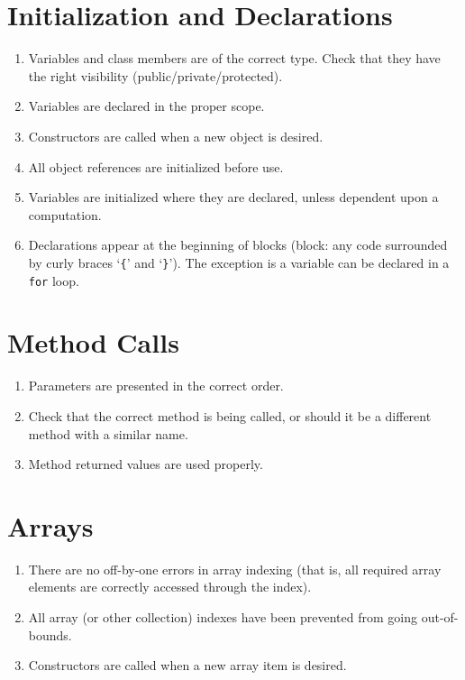 \documentclass{scrreprt}
\begin{document}
\begin{appendix}
\section*{Initialization and Declarations}\begin{enumerate}[resume]
\item Variables and class members are of the correct type. Check that they have the right visibility (public/private/protected).
\item Variables are declared in the proper scope.
\item Constructors are called when a new object is desired.
\item All object references are initialized before use.
\item Variables are initialized where they are declared, unless dependent upon a computation.
\item Declarations appear at the beginning of blocks (block: any code surrounded by curly braces `\texttt{\{}' and `\texttt{\}}'). The exception is a variable can be declared in a \texttt{for} loop.
\end{enumerate}

\section*{Method Calls}\begin{enumerate}[resume]
\item Parameters are presented in the correct order.
\item Check that the correct method is being called, or should it be a different method with a similar name.
\item Method returned values are used properly.
\end{enumerate}

\section*{Arrays}\begin{enumerate}[resume]
\item There are no off-by-one errors in array indexing (that is, all required array elements are correctly accessed through the index).
\item All array (or other collection) indexes have been prevented from going out-of-bounds.
\item Constructors are called when a new array item is desired.
\end{enumerate}


\end{appendix}
\end{document}
